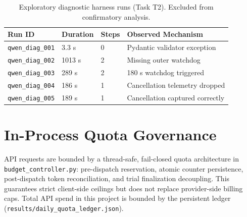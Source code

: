 \documentclass[conference]{IEEEtran}
\begin{document}
\begin{table}[t]
\centering
\footnotesize
\caption{Exploratory diagnostic harness runs (Task T2). Excluded from confirmatory analysis.}
\label{tab:qwen_runs}
\begin{tabular}{llll}
\toprule
\textbf{Run ID} & \textbf{Duration} & \textbf{Steps} & \textbf{Observed Mechanism} \\
\midrule
\texttt{qwen\_diag\_001} & 3.3 s    & 0 & Pydantic validator exception \\
\texttt{qwen\_diag\_002} & 1013 s   & 2 & Missing outer watchdog \\
\texttt{qwen\_diag\_003} & 289 s    & 2 & 180 s watchdog triggered \\
\texttt{qwen\_diag\_004} & 186 s    & 1 & Cancellation telemetry dropped \\
\texttt{qwen\_diag\_005} & 189 s    & 1 & Cancellation captured correctly \\
\bottomrule
\end{tabular}
\end{table}

\FloatBarrier

\section{In-Process Quota Governance}
\label{app:quota}

API requests are bounded by a thread-safe, fail-closed quota architecture in \texttt{budget\_controller.py}: pre-dispatch reservation, atomic counter persistence, post-dispatch token reconciliation, and trial finalization decoupling. This guarantees strict client-side ceilings but does not replace provider-side billing caps. Total API spend in this project is bounded by the persistent ledger (\texttt{results/daily\_quota\_ledger.json}).
\end{document}
